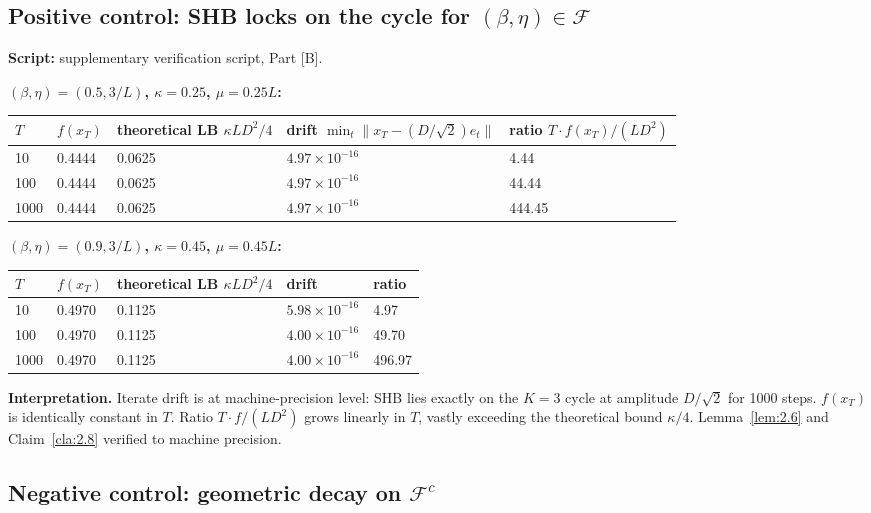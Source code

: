 \documentclass[11pt,a4paper]{article}
\theoremstyle{plain}
\theoremstyle{definition}
\theoremstyle{remark}
\newcommand{\F}{\mathcal{F}}
\begin{document}
\subsection{Positive control: SHB locks on the cycle for $(\beta,\eta) \in \F$}

\textbf{Script:} supplementary verification script, Part [B].

\textbf{$(\beta,\eta) = (0.5, 3/L)$, $\kappa = 0.25$, $\mu = 0.25 L$:}

\begin{center}
\begin{tabular}{@{}lllll@{}}
\toprule
$T$  & $f(x_T)$ & theoretical LB $\kappa L D^2/4$ & drift $\min_t \|x_T - (D/\sqrt 2) e_t\|$ & ratio $T \cdot f(x_T)/(LD^2)$ \\
\midrule
10   & 0.4444 & 0.0625 & $4.97 \times 10^{-16}$ & 4.44   \\
100  & 0.4444 & 0.0625 & $4.97 \times 10^{-16}$ & 44.44  \\
1000 & 0.4444 & 0.0625 & $4.97 \times 10^{-16}$ & 444.45 \\
\bottomrule
\end{tabular}
\end{center}

\textbf{$(\beta,\eta) = (0.9, 3/L)$, $\kappa = 0.45$, $\mu = 0.45 L$:}

\begin{center}
\begin{tabular}{@{}lllll@{}}
\toprule
$T$  & $f(x_T)$ & theoretical LB $\kappa L D^2/4$ & drift & ratio \\
\midrule
10   & 0.4970 & 0.1125 & $5.98 \times 10^{-16}$ & 4.97   \\
100  & 0.4970 & 0.1125 & $4.00 \times 10^{-16}$ & 49.70  \\
1000 & 0.4970 & 0.1125 & $4.00 \times 10^{-16}$ & 496.97 \\
\bottomrule
\end{tabular}
\end{center}

\textbf{Interpretation.} Iterate drift is at machine-precision level: SHB lies exactly on the $K=3$ cycle at amplitude $D/\sqrt 2$ for 1000 steps. $f(x_T)$ is identically constant in $T$. Ratio $T\cdot f/(LD^2)$ grows linearly in $T$, vastly exceeding the theoretical bound $\kappa/4$. Lemma~\ref{lem:2.6} and Claim~\ref{cla:2.8} verified to machine precision.

\subsection{Negative control: geometric decay on $\F^c$}
\end{document}
